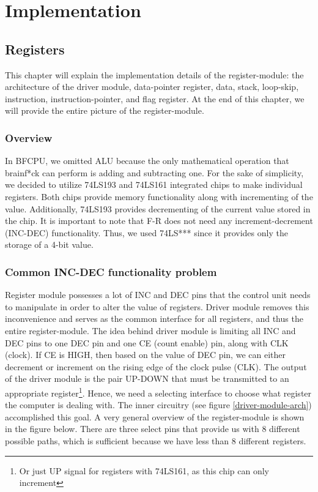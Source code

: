 \section{Implementation} \label{sec:implementation}
\subsection{Registers}
This chapter will explain the implementation details of the register-module: the architecture of the driver module, data-pointer register, data, stack, loop-skip, instruction, instruction-pointer, and flag register. At the end of this chapter, we will provide the entire picture of the register-module.

\subsubsection{Overview}
In BFCPU, we omitted ALU because the only mathematical operation that brainf*ck can perform is adding and subtracting one. For the sake of simplicity, we decided to utilize 74LS193 and 74LS161 integrated chips to make individual registers. Both chips provide memory functionality along with incrementing of the value. Additionally, 74LS193 provides decrementing of the current value stored in the chip. It is important to note that F-R does not need any increment-decrement (INC-DEC) functionality. Thus, we used 74LS*** since it provides only the storage of a 4-bit value. 

\subsubsection{Common INC-DEC functionality problem}
Register module possesses a lot of INC and DEC pins that the control unit needs to manipulate in order to alter the value of registers. Driver module removes this inconvenience and serves as the common interface for all registers, and thus the entire register-module. The idea behind driver module is limiting all INC and DEC pins to one DEC pin and one CE (count enable) pin, along with CLK (clock). If CE is HIGH, then based on the value of DEC pin, we can either decrement or increment on the rising edge of the clock pulse (CLK). The output of the driver module is the pair UP-DOWN that must be transmitted to an appropriate register\footnote{Or just UP signal for registers with 74LS161, as this chip can only increment}. Hence, we need a selecting interface to choose what register the computer is dealing with. The inner circuitry (see figure \ref{driver-module-arch}) accomplished this goal. A very general overview of the register-module is shown in the figure below. There are three select pins that provide us with 8 different possible paths, which is sufficient because we have less than 8 different registers.

